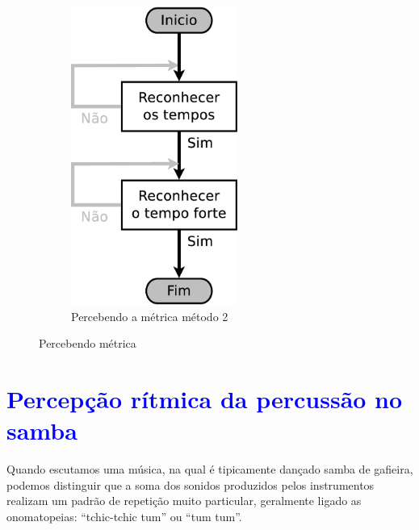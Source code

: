 \begin{figure}[h]
\begin{subfigure}[c]{0.45\textwidth}
\includegraphics[width=0.6\textwidth]{chapters/cap-musica-musicalidade/dancanopulso2.eps}
\caption{Percebendo a métrica método 2}
\label{fig:fluxodancanopulso2}
\end{subfigure}
    \caption{Percebendo métrica}\label{fig:fluxodancanopulso}
\end{figure}


\section{\textcolor{blue}{Percepção rítmica da percussão no samba}}
\label{sec:percepcaoouvinte}
Quando escutamos uma música, na qual é tipicamente dançado samba de gafieira,
podemos distinguir que a soma dos sonidos produzidos pelos instrumentos realizam 
um padrão de repetição muito particular, geralmente ligado as onomatopeias: ``tchic-tchic tum'' ou ``tum tum''.


